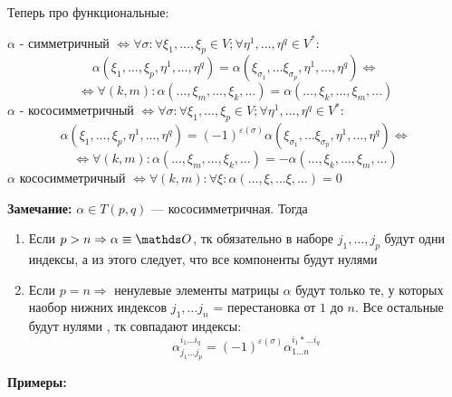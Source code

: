 Теперь про функциональные:

$\alpha$ - симметричный $\Leftrightarrow \forall \sigma: \forall \xi_1,\ldots , \xi_p \in V; \forall \eta^1,\ldots, \eta^q \in V^*: $
$$\alpha(\xi_1,\ldots, \xi_p,\eta^1,\ldots, \eta^q) = \alpha (\xi_{\sigma_1},\ldots \xi_{\sigma_p
}, \eta^1, \ldots, \eta^q) \Leftrightarrow$$
$$\Leftrightarrow \forall (k,m): \alpha(\ldots, \xi_m, \ldots,\xi_k,\ldots) = \alpha (\ldots, \xi_k,\ldots, \xi_m,\ldots)$$
$\alpha$ - кососимметричный $\Leftrightarrow \forall \sigma: \forall \xi_1,\ldots , \xi_p \in V; \forall \eta^1,\ldots, \eta^q \in V^*: $
$$\alpha(\xi_1,\ldots, \xi_p,\eta^1,\ldots, \eta^q) =(-1)^{\varepsilon(\sigma)} \alpha (\xi_{\sigma_1},\ldots \xi_{\sigma_p
}, \eta^1, \ldots, \eta^q) \Leftrightarrow$$
$$\Leftrightarrow \forall (k,m): \alpha(\ldots, \xi_m, \ldots,\xi_k,\ldots) = -\alpha (\ldots, \xi_k,\ldots, \xi_m,\ldots)$$
 $\alpha $ кососимметричный $\Leftrightarrow\forall (k,m):\forall \xi: \alpha(\ldots, \xi, \ldots \xi, \ldots ) = 0$

\textbf{Замечание:} $\alpha \in T(p,q)$ --- кососимметричная. Тогда
\begin{enumerate}
    \item Если $p>n \Rightarrow \alpha \equiv \zero$, тк обязательно в наборе $j_1,\ldots, j_p$ будут одни индексы, а из этого следует, что все компоненты будут нулями
    \item Если $p=n \Rightarrow$ ненулевые элементы матрицы $\alpha$ будут только те, у которых наобор нижних индексов $j_1,\ldots j_n$ = перестановка от $1$ до $n$. Все остальные будут нулями , тк совпадают индексы:
    $$\alpha_{j_1\ldots j_p}^{i_1\ldots i_q} = (-1)^{\varepsilon(\sigma)}\alpha_{1\ldots n}^{i_1* \ldots i_q}$$
\end{enumerate}

\textbf{Примеры:}

